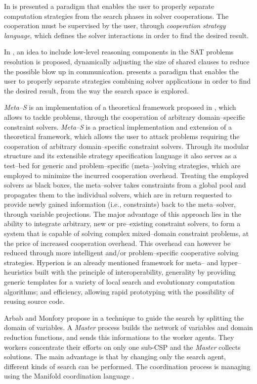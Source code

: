 In \cite{Pajot2003} is presented a paradigm that enables the user to properly separate computation strategies from the search phases in solver cooperations. The cooperation must be supervised by the user, through {\it cooperation strategy language}, which defines the solver interactions in order to find the desired result.

In \cite{Hamadi2012}, an idea to include low-level reasoning components in the SAT problems resolution is proposed, dynamically adjusting the size of shared clauses to reduce the possible blow up in communication. \cite{Pajot2003} presents a paradigm that enables the user to properly separate strategies combining solver applications in order to find the desired result, from the way the search space is explored. 

{\it Meta--S} is an implementation of a theoretical framework proposed in \cite{Frank2003}, which allows to tackle problems, through the cooperation of arbitrary domain--specific constraint solvers. {\it Meta--S} \cite{Frank2003} is a practical implementation and extension of a theoretical framework, which allows the user to attack problems requiring the cooperation of arbitrary domain--specific constraint solvers. Through its modular structure and its extensible strategy specification language it also serves as a test--bed for generic and problem--specific (meta--)solving strategies, which are employed to minimize the incurred cooperation overhead. Treating the employed solvers as black boxes, the meta--solver takes constraints from a global pool and propagates them to the individual solvers, which are in return requested to provide newly gained information (i.e., constraints) back to the meta--solver, through variable projections. The major advantage of this approach lies in the ability to integrate arbitrary, new or pre--existing constraint solvers, to form a system that is capable of solving complex mixed--domain constraint problems, at the price of increased cooperation overhead. This overhead can however be reduced through more intelligent and/or problem--specific cooperative solving strategies. {\sc Hyperion} \cite{Brownlee2014} is an already mentioned framework for meta-- and hyper--heuristics built with the principle of interoperability, generality by providing generic templates for a variety of local search and evolutionary computation algorithms; and efficiency, allowing rapid prototyping with the possibility of reusing source code.

Arbab and Monfory propose in \cite{Arbab2000} a technique to guide the search by splitting the domain of variables. A \textit{Master} process builds the network of variables and domain reduction functions, and sends this informations to the worker agents. They workers concentrate their efforts on only one sub-CSP and the \textit{Master} collects solutions. The main advantage is that by changing only the search agent, different kinds of search can be performed. The coordination process is managing using the {\sc Manifold} coordination language \cite{Arbab1995}.

